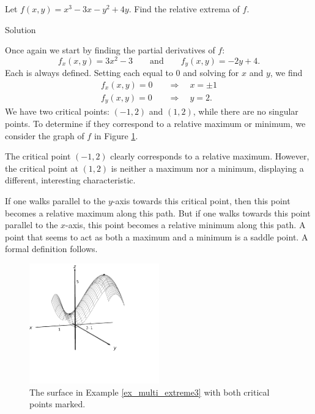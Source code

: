 \begin{example}\label{ex_multi_extreme3}
Let $f(x,y) = x^3-3x-y^2+4y$. Find the relative extrema of $f$.

\pagebreak
{}Solution 

Once again we start by finding the partial derivatives of $f$:
$$f_x(x,y) = 3x^2-3\qquad \text{and} \qquad f_y(x,y) = -2y+4.$$
Each is always defined. Setting each equal to 0 and solving for $x$ and $y$, we find
\begin{align*}
f_x(x,y) = 0 \quad & \Rightarrow \quad x = \pm 1\\
f_y(x,y) = 0 \quad & \Rightarrow \quad y = 2.
\end{align*}
We have two critical points: $(-1,2)$ and $(1,2)$, while there are no singular points. To determine if they correspond to a relative maximum or minimum, we consider the graph of $f$ in Figure \ref{fig_multi_var_23}.


The critical point $(-1,2)$ clearly corresponds to a relative maximum. However, the critical point at $(1,2)$ is neither a maximum nor a minimum, displaying a different, interesting characteristic. 

If one walks parallel to the $y$-axis towards this critical point, then this point becomes a relative maximum along this path. But if one walks towards this point parallel to the $x$-axis, this point becomes a relative minimum along this path. A point that seems to act as both a maximum and a minimum is a saddle point. A formal definition follows.

\begin{figure}[H]
	\begin{center}
			\includegraphics[width=0.5\textwidth]{fig_multi_var_25}
	\caption{The surface in Example \ref{ex_multi_extreme3} with both critical points marked.}
	\label{fig_multi_var_23}
	\end{center}
\end{figure}
\end{example}

